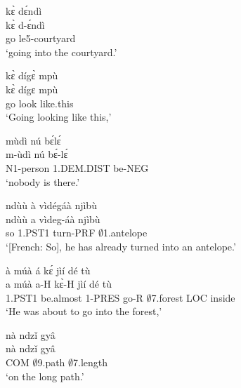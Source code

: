 \begin{exe} 
\exA\label{15}
  \glll   kɛ̀ dɛ́ndì \\
         kɛ̀ d-ɛ́ndì \\
          go le5-courtyard \\
    \trans `going into the courtyard.'
\end{exe}

\begin{exe} 
\exA\label{16}
  \glll  kɛ̀ dígɛ̀ mpù \\
       kɛ̀ dígɛ mpù \\
          go look like.this       \\
    \trans `Going looking like this,'
\end{exe}

\begin{exe} 
\exA\label{17}
  \glll  mùdì nú bɛ́lɛ́ \\
        m-ùdì nú bɛ́-lɛ́ \\
         N1-person 1.DEM.DIST be-NEG \\
    \trans `nobody is there.'
\end{exe}

\begin{exe} 
\exA\label{18}
  \glll  ndùù à vìdégáà njìbù   \\
          ndùù a vìdeg-áà njìbù \\
           so  1.PST1 turn-PRF $\emptyset$1.antelope    \\
    \trans `[French: So], he has already turned into an antelope.'
\end{exe}

\begin{exe} 
\exA\label{19}
  \glll  à múà á kɛ́ jìí dé tù    \\
          a múà a-H kɛ̀-H jìí dé tù       \\
       1.PST1 be.almost 1-PRES go-R $\emptyset$7.forest LOC inside \\
    \trans `He was about to go into the forest,'
\end{exe}

\begin{exe} 
\exA\label{20}
  \glll   nà ndzǐ gyâ   \\
          nà ndzǐ gyâ   \\
           COM $\emptyset$9.path $\emptyset$7.length \\
    \trans `on the long path.'
\end{exe}

